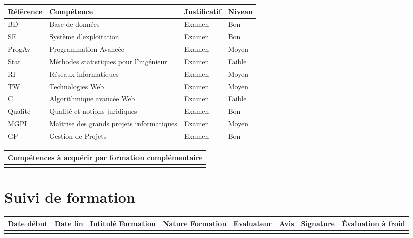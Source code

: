 \documentclass[11pt]{article}
\begin{document}
\centering
	\begin{longtable}{|p{3cm}|p{3cm}|p{3cm}|p{3cm}|}
	\hline
	\rowcolor{gray!40} Référence & Compétence & Justificatif & Niveau \\
	\hline
	 BD & Base de données & Examen & Bon \\
	 \hline
	  SE & Système d'exploitation & Examen & Bon\\
	  \hline
	  ProgAv & Programmation Avancée & Examen & Moyen\\
	  \hline
	  Stat & Méthodes statistiques pour l'ingénieur & Examen & Faible \\ 
	  \hline
	  RI & Réseaux informatiques & Examen & Moyen \\
	  \hline
	  TW & Technologies Web & Examen & Moyen \\
	  \hline
	  C & Algorithmique avancée Web & Examen & Faible \\
	  \hline
	  Qualité & Qualité et notions juridiques & Examen & Bon \\
	  \hline
	  MGPI & Maîtrise des grands projets informatiques & Examen & Moyen \\
	  \hline
	  GP & Gestion de Projets & Examen & Bon \\
	  
	\hline
	\end{longtable}

\centering
	\begin{longtable}{|p{12cm}|}
	\hline
	\rowcolor{gray!40} Compétences à acquérir par formation complémentaire \\
	\hline
	  \\
	\hline
	\end{longtable}

\section*{\large Suivi de formation}

\centering
	\begin{longtable}{|p{1.2cm}|p{1.2cm}|p{1.2cm}|p{1.2cm}|p{1.2cm}|p{1.2cm}|p{1.2cm}|p{1.2cm}|}
	\hline
	\rowcolor{gray!40} \tiny Date début & \tiny Date fin & \tiny Intitulé Formation & \tiny Nature Formation & \tiny Evaluateur & \tiny Avis & \tiny Signature & \tiny Évaluation à froid \\
	\hline
	 & & & & & & & \\
	\hline
	\end{longtable}
\end{document}
